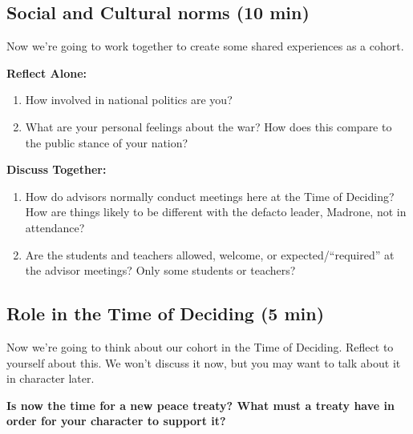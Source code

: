\documentclass[green]{GL2020}
\begin{document}
\subsection*{Social and Cultural norms (10 min)}
Now we’re going to work together to create some shared experiences as a cohort.

\textbf{Reflect Alone:} 
\begin{enumerate}
	\item How involved in national politics are you?
	\item What are your personal feelings about the war? How does this compare to the public stance of your nation?
\end{enumerate}

\textbf{Discuss Together:}
\begin{enumerate}
	\item How do advisors normally conduct meetings here at the Time of Deciding? How are things likely to be different with the defacto leader, Madrone, not in attendance?
	\item Are the students and teachers allowed, welcome, or expected/``required'' at the advisor meetings? Only some students or teachers?
\end{enumerate}

\subsection*{Role in the Time of Deciding (5 min)}
Now we’re going to think about our cohort in the Time of Deciding. Reflect to yourself about this. We won't discuss it now, but you may want to talk about it in character later.

\textbf{Is now the time for a new peace treaty? What must a treaty have in order for your character to support it?}
\end{document}
